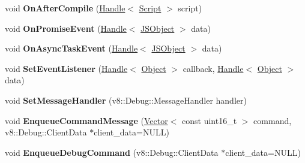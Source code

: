 \begin{DoxyCompactItemize}
\item 
\hypertarget{classv8_1_1internal_1_1_debug_a93c2f89ac79abb686b6d3ee02074339d}{}void {\bfseries On\+After\+Compile} (\hyperlink{classv8_1_1internal_1_1_handle}{Handle}$<$ \hyperlink{classv8_1_1internal_1_1_script}{Script} $>$ script)\label{classv8_1_1internal_1_1_debug_a93c2f89ac79abb686b6d3ee02074339d}

\item 
\hypertarget{classv8_1_1internal_1_1_debug_ace1a9052d54990ac0d850ea471f731e7}{}void {\bfseries On\+Promise\+Event} (\hyperlink{classv8_1_1internal_1_1_handle}{Handle}$<$ \hyperlink{classv8_1_1internal_1_1_j_s_object}{J\+S\+Object} $>$ data)\label{classv8_1_1internal_1_1_debug_ace1a9052d54990ac0d850ea471f731e7}

\item 
\hypertarget{classv8_1_1internal_1_1_debug_a3cfb85d71cae2e42513bcf539d303a74}{}void {\bfseries On\+Async\+Task\+Event} (\hyperlink{classv8_1_1internal_1_1_handle}{Handle}$<$ \hyperlink{classv8_1_1internal_1_1_j_s_object}{J\+S\+Object} $>$ data)\label{classv8_1_1internal_1_1_debug_a3cfb85d71cae2e42513bcf539d303a74}

\item 
\hypertarget{classv8_1_1internal_1_1_debug_aa1b17c10ac21e9fe519e06ab5185000d}{}void {\bfseries Set\+Event\+Listener} (\hyperlink{classv8_1_1internal_1_1_handle}{Handle}$<$ \hyperlink{classv8_1_1internal_1_1_object}{Object} $>$ callback, \hyperlink{classv8_1_1internal_1_1_handle}{Handle}$<$ \hyperlink{classv8_1_1internal_1_1_object}{Object} $>$ data)\label{classv8_1_1internal_1_1_debug_aa1b17c10ac21e9fe519e06ab5185000d}

\item 
\hypertarget{classv8_1_1internal_1_1_debug_a5d583889f8f94fd13fa4a5de12c35788}{}void {\bfseries Set\+Message\+Handler} (v8\+::\+Debug\+::\+Message\+Handler handler)\label{classv8_1_1internal_1_1_debug_a5d583889f8f94fd13fa4a5de12c35788}

\item 
\hypertarget{classv8_1_1internal_1_1_debug_a2270b45d81c0021c5c2e209c6c5a076d}{}void {\bfseries Enqueue\+Command\+Message} (\hyperlink{classv8_1_1internal_1_1_vector}{Vector}$<$ const uint16\+\_\+t $>$ command, v8\+::\+Debug\+::\+Client\+Data $\ast$client\+\_\+data=N\+U\+L\+L)\label{classv8_1_1internal_1_1_debug_a2270b45d81c0021c5c2e209c6c5a076d}

\item 
\hypertarget{classv8_1_1internal_1_1_debug_af67c24a8f3726f6011177f1bee7d16ab}{}void {\bfseries Enqueue\+Debug\+Command} (v8\+::\+Debug\+::\+Client\+Data $\ast$client\+\_\+data=N\+U\+L\+L)\label{classv8_1_1internal_1_1_debug_af67c24a8f3726f6011177f1bee7d16ab}


\end{DoxyCompactItemize}

